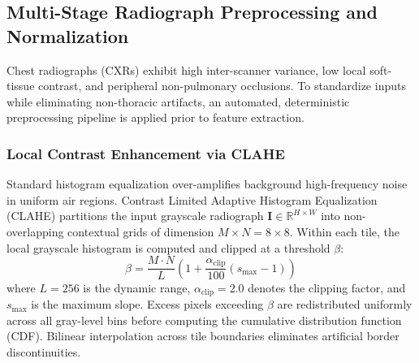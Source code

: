 \documentclass[journal]{IEEEtran}
\begin{document}
\subsection{Multi-Stage Radiograph Preprocessing and Normalization}
\label{subsec:preprocessing}

Chest radiographs (CXRs) exhibit high inter-scanner variance, low local soft-tissue contrast, and peripheral non-pulmonary occlusions. To standardize inputs while eliminating non-thoracic artifacts, an automated, deterministic preprocessing pipeline is applied prior to feature extraction.

\subsubsection{Local Contrast Enhancement via CLAHE}
Standard histogram equalization over-amplifies background high-frequency noise in uniform air regions. Contrast Limited Adaptive Histogram Equalization (CLAHE) partitions the input grayscale radiograph $\mathbf{I} \in \mathbb{R}^{H \times W}$ into non-overlapping contextual grids of dimension $M \times N = 8 \times 8$. Within each tile, the local grayscale histogram is computed and clipped at a threshold $\beta$:
\begin{equation}
\beta = \frac{M \cdot N}{L} \left(1 + \frac{\alpha_{\text{clip}}}{100}(s_{\max} - 1)\right)
\label{eq:clahe_clip}
\end{equation}
where $L=256$ is the dynamic range, $\alpha_{\text{clip}} = 2.0$ denotes the clipping factor, and $s_{\max}$ is the maximum slope. Excess pixels exceeding $\beta$ are redistributed uniformly across all gray-level bins before computing the cumulative distribution function (CDF). Bilinear interpolation across tile boundaries eliminates artificial border discontinuities.
\end{document}
